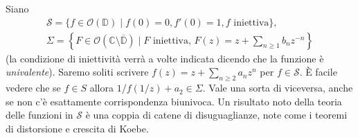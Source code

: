 Siano
\begin{gather*}
  \mathcal{S}=\{f \in \mathcal{O}(\mathbb{D}) \mid f(0)=0, f'(0)=1, f \text{ iniettiva}\}, \\
\Sigma=\left\{F \in \mathcal{O}(\mathbb{C}\setminus \overline{\mathbb{D}}) \mid F \text{ iniettiva, } F(z)=z+\sum_{n \ge 1}b_nz^{-n}\right\}
\end{gather*}
(la condizione di iniettività verrà a volte indicata dicendo che la funzione è \textit{univalente}). Saremo soliti scrivere $f(z)=\displaystyle z+\sum_{n \ge 2}a_nz^n$ per $f \in \mathcal{S}$. È facile vedere che se $f \in S$ allora $1/f(1/z)+a_2 \in \Sigma$. Vale una sorta di viceversa, anche se non c'è esattamente corrispondenza biunivoca. Un risultato noto della teoria delle funzioni in $\mathcal{S}$ è una coppia di catene di disuguaglianze, note come i teoremi di distorsione e crescita di Koebe.

